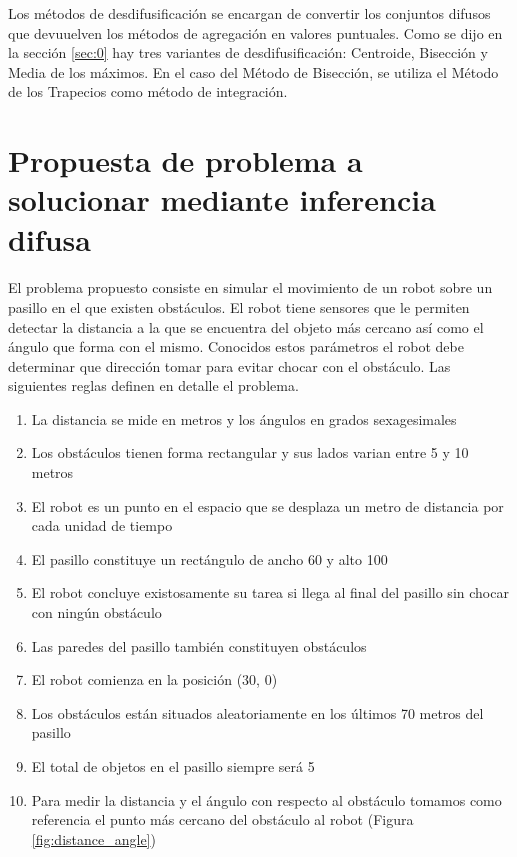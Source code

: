 \documentclass[a4paper,10pt]{article}
\begin{document}
	Los métodos de desdifusificación se encargan de convertir los conjuntos difusos que devuuelven los métodos de agregación en valores puntuales. Como se dijo en la sección \ref{sec:0} hay tres variantes de desdifusificación: Centroide, Bisección y Media de los máximos. En el caso del Método de Bisección, se utiliza el Método de los Trapecios como método de integración.

\section{Propuesta de problema a solucionar mediante inferencia difusa}\label{sec:3}

  \paragraph{}   El problema propuesto consiste en simular el movimiento de un robot sobre un pasillo en el que existen obstáculos.
  El robot tiene sensores que le permiten detectar la distancia a la que se encuentra del objeto más cercano así como el ángulo que forma
  con el mismo. Conocidos estos parámetros el robot debe determinar que dirección tomar para evitar chocar con el obstáculo. Las siguientes reglas definen en detalle el 		  problema.
	\begin{enumerate}
	\item{La distancia se mide en metros y los ángulos en grados sexagesimales}
	\item{Los obstáculos tienen forma rectangular y sus lados varian entre 5 y 10 metros}
	\item{El robot es un punto en el espacio que se desplaza un metro de distancia por cada unidad de tiempo}
	\item{El pasillo constituye un rectángulo de ancho 60 y alto 100}
	\item{El robot concluye existosamente su tarea si llega al final del pasillo sin chocar con ningún obstáculo}
	\item{Las paredes del pasillo también constituyen obstáculos}
	\item{El robot comienza en la posición (30, 0)}
	\item{Los obstáculos están situados aleatoriamente en los últimos 70 metros del pasillo}
	\item{El total de objetos en el pasillo siempre será 5}
	\item{Para medir la distancia y el ángulo con respecto al obstáculo tomamos como referencia el punto más cercano del obstáculo al robot (Figura \ref{fig:distance_angle})}
	\end{enumerate}
	 
\end{document}
